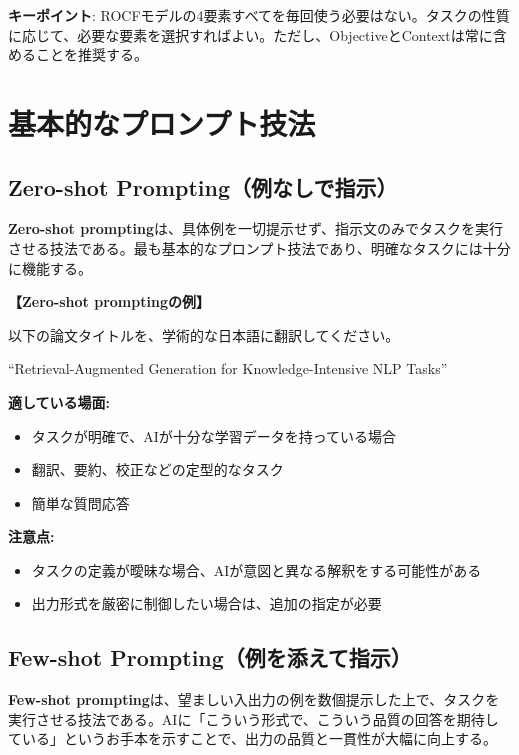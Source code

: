 \begin{screen}
\textbf{キーポイント}: ROCFモデルの4要素すべてを毎回使う必要はない。タスクの性質に応じて、必要な要素を選択すればよい。ただし、ObjectiveとContextは常に含めることを推奨する。
\end{screen}

\section{基本的なプロンプト技法}
\label{sec:2.3}

\subsection{Zero-shot Prompting（例なしで指示）}

\textbf{Zero-shot prompting}は、具体例を一切提示せず、指示文のみでタスクを実行させる技法である。最も基本的なプロンプト技法であり、明確なタスクには十分に機能する。

\begin{promptbox}
\textbf{【Zero-shot promptingの例】}

以下の論文タイトルを、学術的な日本語に翻訳してください。

``Retrieval-Augmented Generation for Knowledge-Intensive NLP Tasks''
\end{promptbox}

\textbf{適している場面:}
\begin{itemize}
\item タスクが明確で、AIが十分な学習データを持っている場合
\item 翻訳、要約、校正などの定型的なタスク
\item 簡単な質問応答
\end{itemize}

\textbf{注意点:}
\begin{itemize}
\item タスクの定義が曖昧な場合、AIが意図と異なる解釈をする可能性がある
\item 出力形式を厳密に制御したい場合は、追加の指定が必要
\end{itemize}

\subsection{Few-shot Prompting（例を添えて指示）}

\textbf{Few-shot prompting}は、望ましい入出力の例を数個提示した上で、タスクを実行させる技法である\cite{brown2020language}。AIに「こういう形式で、こういう品質の回答を期待している」というお手本を示すことで、出力の品質と一貫性が大幅に向上する。

